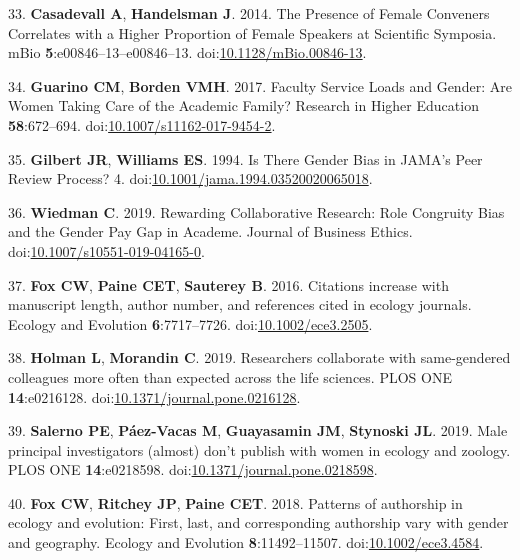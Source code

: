\documentclass[11pt,]{article}
\begin{document}
\hypertarget{ref-casadevall_presence_2014}{}
33. \textbf{Casadevall A}, \textbf{Handelsman J}. 2014. The Presence of
Female Conveners Correlates with a Higher Proportion of Female Speakers
at Scientific Symposia. mBio \textbf{5}:e00846--13--e00846--13.
doi:\href{https://doi.org/10.1128/mBio.00846-13}{10.1128/mBio.00846-13}.

\hypertarget{ref-guarino_faculty_2017}{}
34. \textbf{Guarino CM}, \textbf{Borden VMH}. 2017. Faculty Service
Loads and Gender: Are Women Taking Care of the Academic Family? Research
in Higher Education \textbf{58}:672--694.
doi:\href{https://doi.org/10.1007/s11162-017-9454-2}{10.1007/s11162-017-9454-2}.

\hypertarget{ref-gilbert_is_1994}{}
35. \textbf{Gilbert JR}, \textbf{Williams ES}. 1994. Is There Gender
Bias in JAMA's Peer Review Process? 4.
doi:\href{https://doi.org/10.1001/jama.1994.03520020065018}{10.1001/jama.1994.03520020065018}.

\hypertarget{ref-wiedman_rewarding_2019}{}
36. \textbf{Wiedman C}. 2019. Rewarding Collaborative Research: Role
Congruity Bias and the Gender Pay Gap in Academe. Journal of Business
Ethics.
doi:\href{https://doi.org/10.1007/s10551-019-04165-0}{10.1007/s10551-019-04165-0}.

\hypertarget{ref-fox_citations_2016}{}
37. \textbf{Fox CW}, \textbf{Paine CET}, \textbf{Sauterey B}. 2016.
Citations increase with manuscript length, author number, and references
cited in ecology journals. Ecology and Evolution \textbf{6}:7717--7726.
doi:\href{https://doi.org/10.1002/ece3.2505}{10.1002/ece3.2505}.

\hypertarget{ref-holman_researchers_2019}{}
38. \textbf{Holman L}, \textbf{Morandin C}. 2019. Researchers
collaborate with same-gendered colleagues more often than expected
across the life sciences. PLOS ONE \textbf{14}:e0216128.
doi:\href{https://doi.org/10.1371/journal.pone.0216128}{10.1371/journal.pone.0216128}.

\hypertarget{ref-Salerno2019}{}
39. \textbf{Salerno PE}, \textbf{Páez-Vacas M}, \textbf{Guayasamin JM},
\textbf{Stynoski JL}. 2019. Male principal investigators (almost) don't
publish with women in ecology and zoology. PLOS ONE
\textbf{14}:e0218598.
doi:\href{https://doi.org/10.1371/journal.pone.0218598}{10.1371/journal.pone.0218598}.

\hypertarget{ref-Fox2018}{}
40. \textbf{Fox CW}, \textbf{Ritchey JP}, \textbf{Paine CET}. 2018.
Patterns of authorship in ecology and evolution: First, last, and
corresponding authorship vary with gender and geography. Ecology and
Evolution \textbf{8}:11492--11507.
doi:\href{https://doi.org/10.1002/ece3.4584}{10.1002/ece3.4584}.
\end{document}
